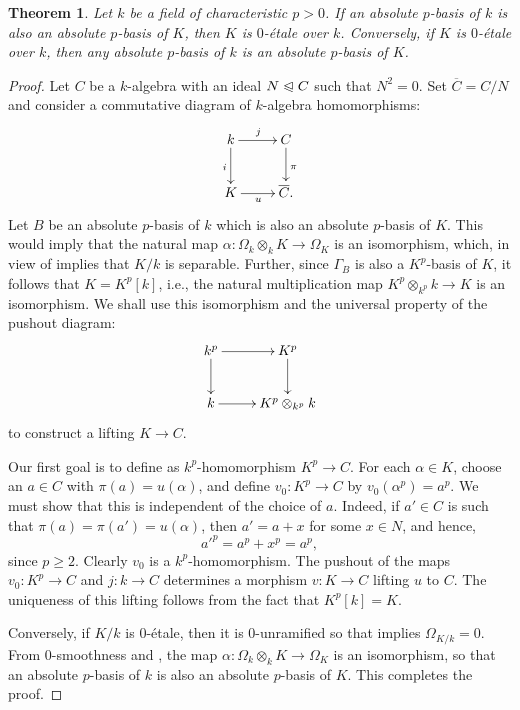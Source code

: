 \documentclass[10pt]{article}
\theoremstyle{thmstyle}
\newtheorem{theorem}{Theorem}[section]
\theoremstyle{defstyle}
\renewcommand{\ge}{\geqslant}
\newcommand{\noreq}{\trianglelefteqslant}
\begin{document}
\begin{theorem}
    Let $k$ be a field of characteristic $p > 0$. If an absolute $p$-basis of $k$ is also an absolute $p$-basis of $K$, then $K$ is $0$-\'etale over $k$. Conversely, if $K$ is $0$-\'etale over $k$, then any absolute $p$-basis of $k$ is an absolute $p$-basis of $K$.
\end{theorem}
\begin{proof}
    Let $C$ be a $k$-algebra with an ideal $N\noreq C$ such that $N^2 = 0$. Set $\overline C = C/N$ and consider a commutative diagram of $k$-algebra homomorphisms: 
    \begin{equation*}
        \xymatrix {
            k\ar[r]^j\ar[d]_i & C\ar[d]^\pi\\
            K\ar[r]_u & \overline{C}.
        }
    \end{equation*}
    Let $B$ be an absolute $p$-basis of $k$ which is also an absolute $p$-basis of $K$. This would imply that the natural map $\alpha\colon\Omega_k\otimes_k K\to\Omega_K$ is an isomorphism, which, in view of  implies that $K/k$ is separable. Further, since $\Gamma_B$ is also a $K^p$-basis of $K$, it follows that $K = K^p[k]$, i.e., the natural multiplication map $K^p\otimes_{k^p} k\to K$ is an isomorphism. We shall use this isomorphism and the universal property of the pushout diagram: 
    \begin{equation*}
        \xymatrix {
            k^p\ar[r]\ar[d] & K^p\ar[d]\\
            k\ar[r] & K^p\otimes_{k^p} k
        }
    \end{equation*}
    to construct a lifting $K\to C$. 

    Our first goal is to define as $k^p$-homomorphism $K^p\to C$. For each $\alpha\in K$, choose an $a\in C$ with $\pi(a) = u(\alpha)$, and define $v_0\colon K^p\to C$ by $v_0(\alpha^p) = a^p$. We must show that this is independent of the choice of $a$. Indeed, if $a'\in C$ is such that $\pi(a) = \pi(a') = u(\alpha)$, then $a' = a + x$ for some $x\in N$, and hence, 
    \begin{equation*}
        a'^p = a^p + x^p = a^p,
    \end{equation*}
    since $p\ge 2$. Clearly $v_0$ is a $k^p$-homomorphism. The pushout of the maps $v_0\colon K^p\to C$ and $j\colon k\to C$ determines a morphism $v\colon K\to C$ lifting $u$ to $C$. The uniqueness of this lifting follows from the fact that $K^p[k] = K$.

    Conversely, if $K/k$ is $0$-\'etale, then it is $0$-unramified so that  implies $\Omega_{K/k} = 0$. From $0$-smoothness and , the map $\alpha\colon\Omega_k\otimes_k K\to\Omega_K$ is an isomorphism, so that an absolute $p$-basis of $k$ is also an absolute $p$-basis of $K$. This completes the proof.
\end{proof}
\end{document}
